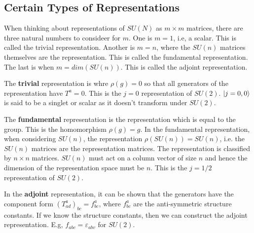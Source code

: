 \subsection{Certain Types of Representations}
When thinking about representations of $SU(N)$ as $m\times m$ matrices,
there are three natural numbers to consideer for $m$. One is $m=1$, i.e, a
scalar. This is called the trivial representation. Another is $m=n$, where
the $SU(n)$ matrices themselves are the representation. This is called
the fundamental representation. The last is when $m=dim(SU(n))$. This is
called the adjoint representation.
\par The \textbf{trivial} representation is whre $\rho(g)=0$ so that all
generators of the representation have $T^a=0$. This is the $j=0$ representation 
of $SU(2)$. $\ket{j=0,0}$ is said to be a singlet or scalar as it doesn't
transform under $SU(2)$.
\par The \textbf{fundamental} representation is the representation which
is equal to the group. This is the homomorphism $\rho(g)=g$. In the fundamental
representation, when considering $SU(n)$, the representation
$\rho(SU(n))=SU(n)$, i.e. the $SU(n)$ matrices are the representation matrices.
The representation is classified by $n\times n$ matrices. $SU(n)$ must act on
a column vector of size $n$ and hence the dimension of the representation space
must be $n$. This is the $j=1/2$ representation of $SU(2)$.
\par In the \textbf{adjoint} representation, it can be shown that the
generators have the component form $(T^a_{ad})_{bc} = f^a_{bc}$, where
$f_{bc}^a$ are the anti-symmetric structure constants. If we know the
structure constants, then we can construct the adjoint representation. E.g,
$f_{abc} = \varepsilon_{abv}$ for $SU(2)$.


